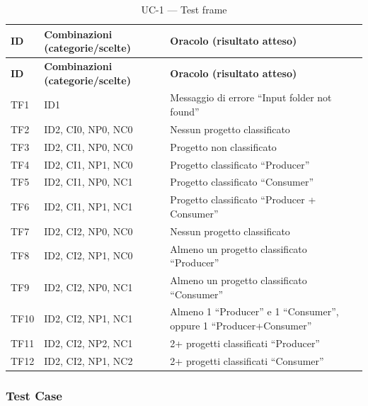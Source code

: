 \documentclass[11pt,a4paper]{article}
\newcommand{\thead}[1]{\textbf{#1}}
\begin{document}
\begin{longtable}{@{}L{1.5cm} L{4.6cm} L{8.8cm}@{}}
  \caption{UC-1 --- Test frame}\label{tab:uc1-tf}\\
  \toprule
  \thead{ID} & \thead{Combinazioni (categorie/scelte)} &
  \thead{Oracolo (risultato atteso)}\\
  \midrule
  \endfirsthead
  \toprule
  \thead{ID} & \thead{Combinazioni (categorie/scelte)} &
  \thead{Oracolo (risultato atteso)}\\
  \midrule
  \endhead
  \bottomrule
  \endfoot
  TF1  & ID1                & Messaggio di errore ``Input folder not found''\\
  TF2  & ID2, CI0, NP0, NC0 & Nessun progetto classificato\\
  TF3  & ID2, CI1, NP0, NC0 & Progetto non classificato\\
  TF4  & ID2, CI1, NP1, NC0 & Progetto classificato ``Producer''\\
  TF5  & ID2, CI1, NP0, NC1 & Progetto classificato ``Consumer''\\
  TF6  & ID2, CI1, NP1, NC1 & Progetto classificato ``Producer + Consumer''\\
  TF7  & ID2, CI2, NP0, NC0 & Nessun progetto classificato\\
  TF8  & ID2, CI2, NP1, NC0 & Almeno un progetto classificato ``Producer''\\
  TF9  & ID2, CI2, NP0, NC1 & Almeno un progetto classificato ``Consumer''\\
  TF10 & ID2, CI2, NP1, NC1 & Almeno 1 ``Producer'' e 1 ``Consumer'', oppure 1 ``Producer+Consumer''\\
  TF11 & ID2, CI2, NP2, NC1 & 2+ progetti classificati ``Producer''\\
  TF12 & ID2, CI2, NP1, NC2 & 2+ progetti classificati ``Consumer''\\
\end{longtable}

\subsubsection{Test Case}
\end{document}
